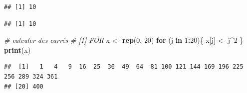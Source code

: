 \documentclass[
]{book}
\newenvironment{Shaded}{\begin{snugshade}}{\end{snugshade}}
\newcommand{\CommentTok}[1]{\textcolor[rgb]{0.56,0.35,0.01}{\textit{#1}}}
\newcommand{\ControlFlowTok}[1]{\textcolor[rgb]{0.13,0.29,0.53}{\textbf{#1}}}
\newcommand{\DataTypeTok}[1]{\textcolor[rgb]{0.13,0.29,0.53}{#1}}
\newcommand{\DecValTok}[1]{\textcolor[rgb]{0.00,0.00,0.81}{#1}}
\newcommand{\KeywordTok}[1]{\textcolor[rgb]{0.13,0.29,0.53}{\textbf{#1}}}
\newcommand{\NormalTok}[1]{#1}
\newcommand{\OperatorTok}[1]{\textcolor[rgb]{0.81,0.36,0.00}{\textbf{#1}}}
\newcommand{\StringTok}[1]{\textcolor[rgb]{0.31,0.60,0.02}{#1}}
\begin{document}
\begin{Shaded}
\end{Shaded}

\begin{verbatim}
## [1] 10
\end{verbatim}

\begin{Shaded}
\end{Shaded}

\begin{verbatim}
## [1] 10
\end{verbatim}

\begin{Shaded}
\begin{Highlighting}[]
\CommentTok{# calculer des carrés}
\CommentTok{# [1] FOR}
\NormalTok{x <-}\StringTok{ }\KeywordTok{rep}\NormalTok{(}\DecValTok{0}\NormalTok{, }\DecValTok{20}\NormalTok{)}
\ControlFlowTok{for}\NormalTok{ (j }\ControlFlowTok{in} \DecValTok{1}\OperatorTok{:}\DecValTok{20}\NormalTok{)\{}
\NormalTok{  x[j] <-}\StringTok{ }\NormalTok{j}\OperatorTok{^}\DecValTok{2}
\NormalTok{\}}
\KeywordTok{print}\NormalTok{(x)}
\end{Highlighting}
\end{Shaded}

\begin{verbatim}
##  [1]   1   4   9  16  25  36  49  64  81 100 121 144 169 196 225 256 289 324 361
## [20] 400
\end{verbatim}
\end{document}

